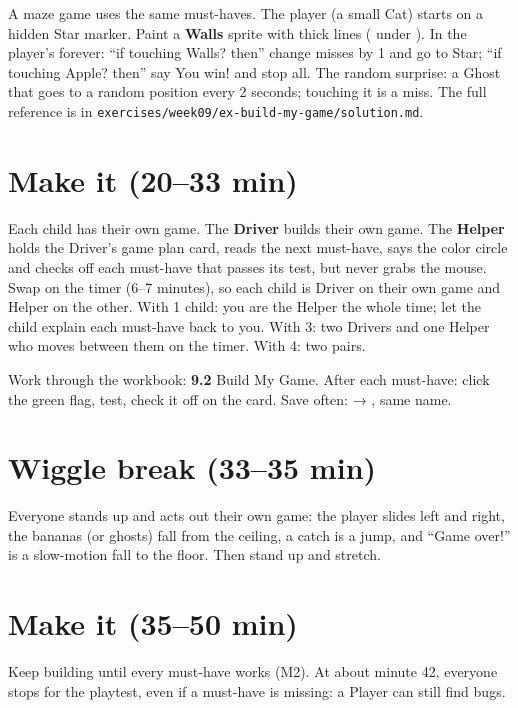 \begin{tip}
A maze game uses the same must-haves. The player (a small Cat) starts on a hidden Star marker. Paint a \textbf{Walls} sprite with thick lines ( under ). In the player's forever: \enquote{if touching Walls? then} change misses by 1 and go to Star; \enquote{if touching Apple? then} say You win! and stop all. The random surprise: a Ghost that goes to a random position every 2 seconds; touching it is a miss. The full reference is in \texttt{exercises/week09/ex-build-my-game/solution.md}.
\end{tip}

\section{Make it (20--33 min)}
\begin{pairroles}
Each child has their own game. The \textbf{Driver} builds their own game. The \textbf{Helper} holds the Driver's game plan card, reads the next must-have, says the color circle and checks off each must-have that passes its test, but never grabs the mouse. Swap on the timer (6--7 minutes), so each child is Driver on their own game and Helper on the other. With 1 child: you are the Helper the whole time; let the child explain each must-have back to you. With 3: two Drivers and one Helper who moves between them on the timer. With 4: two pairs.
\end{pairroles}

Work through the workbook: \textbf{9.2} Build My Game. After each must-have: click the green flag, test, check it off on the card. Save often:  → , same name.

\section{Wiggle break (33--35 min)}
Everyone stands up and acts out their own game: the player slides left and right, the bananas (or ghosts) fall from the ceiling, a catch is a jump, and \enquote{Game over!} is a slow-motion fall to the floor. Then stand up and stretch.

\section{Make it (35--50 min)}
Keep building until every must-have works (M2). At about minute 42, everyone stops for the playtest, even if a must-have is missing: a Player can still find bugs.

